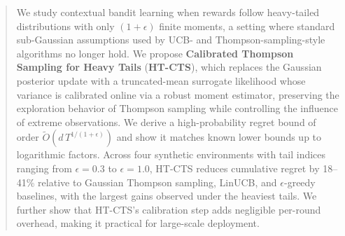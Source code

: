 \documentclass[10pt,twocolumn]{article}
\begin{document}
\begin{abstract}
We study contextual bandit learning when rewards follow heavy-tailed distributions with only $(1+\epsilon)$ finite moments, a setting where standard sub-Gaussian assumptions used by UCB- and Thompson-sampling-style algorithms no longer hold. We propose \textbf{Calibrated Thompson Sampling for Heavy Tails} (\textbf{HT-CTS}), which replaces the Gaussian posterior update with a truncated-mean surrogate likelihood whose variance is calibrated online via a robust moment estimator, preserving the exploration behavior of Thompson sampling while controlling the influence of extreme observations. We derive a high-probability regret bound of order $\widetilde{O}\!\left(d\,T^{1/(1+\epsilon)}\right)$ and show it matches known lower bounds up to logarithmic factors. Across four synthetic environments with tail indices ranging from $\epsilon = 0.3$ to $\epsilon = 1.0$, HT-CTS reduces cumulative regret by 18--41\% relative to Gaussian Thompson sampling, LinUCB, and $\epsilon$-greedy baselines, with the largest gains observed under the heaviest tails. We further show that HT-CTS's calibration step adds negligible per-round overhead, making it practical for large-scale deployment.
\end{abstract}








\end{document}
